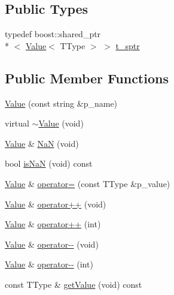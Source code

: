 \subsection*{Public Types}
\begin{DoxyCompactItemize}
\item 
typedef boost\-::shared\-\_\-ptr\\*
$<$ \hyperlink{classxtd_1_1counters_1_1Value}{Value}$<$ T\-Type $>$ $>$ \hyperlink{classxtd_1_1counters_1_1Value_a24669b6d950db6c5c20546ce12a467cf}{t\-\_\-sptr}
\end{DoxyCompactItemize}
\subsection*{Public Member Functions}
\begin{DoxyCompactItemize}
\item 
\hyperlink{classxtd_1_1counters_1_1Value_a298f146ab57eaed8e6f783c26e78e0f4}{Value} (const string \&p\-\_\-name)
\item 
virtual \hyperlink{classxtd_1_1counters_1_1Value_a500d43a2cea3f654aa524959a7893e31}{$\sim$\-Value} (void)
\item 
\hyperlink{classxtd_1_1counters_1_1Value}{Value} \& \hyperlink{classxtd_1_1counters_1_1Value_ab206db077ef38ac776a7e64774f56f2b}{Na\-N} (void)
\item 
bool \hyperlink{classxtd_1_1counters_1_1Value_a6fab70b05b6e99db492e0a3d8a0d9fb6}{is\-Na\-N} (void) const 
\item 
\hyperlink{classxtd_1_1counters_1_1Value}{Value} \& \hyperlink{classxtd_1_1counters_1_1Value_a017667569f4177e0c44836ef4e9bc7b0}{operator=} (const T\-Type \&p\-\_\-value)
\item 
\hyperlink{classxtd_1_1counters_1_1Value}{Value} \& \hyperlink{classxtd_1_1counters_1_1Value_a8e7e5f0ff7388f18deaddf51e016c905}{operator++} (void)
\item 
\hyperlink{classxtd_1_1counters_1_1Value}{Value} \& \hyperlink{classxtd_1_1counters_1_1Value_a4a8989a7f9585998eb4210dfdd1b099e}{operator++} (int)
\item 
\hyperlink{classxtd_1_1counters_1_1Value}{Value} \& \hyperlink{classxtd_1_1counters_1_1Value_ac94ea7115378eb16dbef10d030b52a66}{operator-\/-\/} (void)
\item 
\hyperlink{classxtd_1_1counters_1_1Value}{Value} \& \hyperlink{classxtd_1_1counters_1_1Value_a9036f1b2a2904960e67c1faef11f1835}{operator-\/-\/} (int)
\item 
const T\-Type \& \hyperlink{classxtd_1_1counters_1_1Value_a459b2e9fc6974821968f5c05a62ec4ca}{get\-Value} (void) const 
\end{DoxyCompactItemize}
